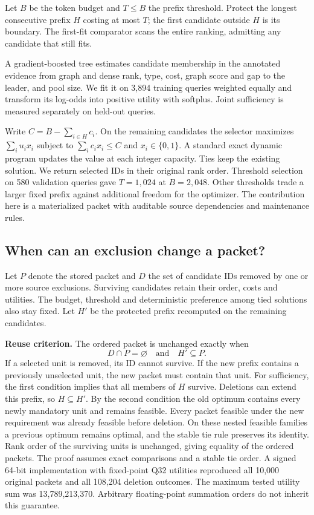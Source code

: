 \documentclass[conference]{IEEEtran}
\begin{document}
Let $B$ be the token budget and $T\leq B$ the prefix threshold. Protect the longest consecutive prefix $H$ costing at most $T$; the first candidate outside $H$ is its boundary. The first-fit comparator scans the entire ranking, admitting any candidate that still fits.

A gradient-boosted tree estimates candidate membership in the annotated evidence from graph and dense rank, type, cost, graph score and gap to the leader, and pool size. We fit it on 3,894 training queries weighted equally and transform its log-odds into positive utility with softplus. Joint sufficiency is measured separately on held-out queries.

Write $C=B-\sum_{i\in H} c_i$. On the remaining candidates the selector maximizes $\sum_i u_i x_i$ subject to $\sum_i c_i x_i\leq C$ and $x_i\in\{0,1\}$. A standard exact dynamic program updates the value at each integer capacity. Ties keep the existing solution. We return selected IDs in their original rank order. Threshold selection on 580 validation queries gave $T=1,024$ at $B=2,048$. Other thresholds trade a larger fixed prefix against additional freedom for the optimizer. The contribution here is a materialized packet with auditable source dependencies and maintenance rules.

\subsection{When can an exclusion change a packet?}
Let $P$ denote the stored packet and $D$ the set of candidate IDs removed by one or more source exclusions. Surviving candidates retain their order, costs and utilities. The budget, threshold and deterministic preference among tied solutions also stay fixed. Let $H'$ be the protected prefix recomputed on the remaining candidates.

\textbf{Reuse criterion.} The ordered packet is unchanged exactly when
\[
           D\cap P=\varnothing \quad\text{and}\quad H'\subseteq P.
\]
If a selected unit is removed, its ID cannot survive. If the new prefix contains a previously unselected unit, the new packet must contain that unit. For sufficiency, the first condition implies that all members of $H$ survive. Deletions can extend this prefix, so $H\subseteq H'$. By the second condition the old optimum contains every newly mandatory unit and remains feasible. Every packet feasible under the new requirement was already feasible before deletion. On these nested feasible families a previous optimum remains optimal, and the stable tie rule preserves its identity. Rank order of the surviving units is unchanged, giving equality of the ordered packets. The proof assumes exact comparisons and a stable tie order. A signed 64-bit implementation with fixed-point Q32 utilities reproduced all 10,000 original packets and all 108,204 deletion outcomes. The maximum tested utility sum was 13,789,213,370. Arbitrary floating-point summation orders do not inherit this guarantee.
\end{document}
